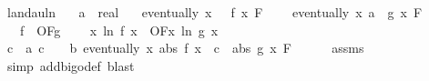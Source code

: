 \begin{isabellebody}
\ landau{\isacharunderscore}{\kern0pt}ln{\isacharunderscore}{\kern0pt}{}{\isacharcolon}{\kern0pt}\isanewline
\ \ \ {\isachardoublequoteopen}a\ {\isachargreater}{\kern0pt}\ {\isacharparenleft}{\kern0pt}{}{\isacharcolon}{\kern0pt}{\isacharcolon}{\kern0pt}real{\isacharparenright}{\kern0pt}{\isachardoublequoteclose}\isanewline
\ \ \ {\isachardoublequoteopen}eventually\ {\isacharparenleft}{\kern0pt}{\isasymlambda}x{\isachardot}{\kern0pt}\ {}\ {\isasymle}\ f\ x{\isacharparenright}{\kern0pt}\ F{\isacharprime}{\kern0pt}{\isachardoublequoteclose}\ \isanewline
\ \ \ {\isachardoublequoteopen}eventually\ {\isacharparenleft}{\kern0pt}{\isasymlambda}x{\isachardot}{\kern0pt}\ a\ {\isasymle}\ g\ x{\isacharparenright}{\kern0pt}\ F{\isacharprime}{\kern0pt}{\isachardoublequoteclose}\ \isanewline
\ \ \ {\isachardoublequoteopen}f\ {\isasymin}\ O{\isacharbrackleft}{\kern0pt}F{\isacharprime}{\kern0pt}{\isacharbrackright}{\kern0pt}{\isacharparenleft}{\kern0pt}g{\isacharparenright}{\kern0pt}{\isachardoublequoteclose}\ \isanewline
\ \ \ {\isachardoublequoteopen}{\isacharparenleft}{\kern0pt}{\isasymlambda}x{\isachardot}{\kern0pt}\ ln\ {\isacharparenleft}{\kern0pt}f\ x{\isacharparenright}{\kern0pt}{\isacharparenright}{\kern0pt}\ {\isasymin}\ O{\isacharbrackleft}{\kern0pt}F{\isacharprime}{\kern0pt}{\isacharbrackright}{\kern0pt}{\isacharparenleft}{\kern0pt}{\isasymlambda}x{\isachardot}{\kern0pt}\ ln\ {\isacharparenleft}{\kern0pt}g\ x{\isacharparenright}{\kern0pt}{\isacharparenright}{\kern0pt}{\isachardoublequoteclose}\ \isanewline
%
\isadelimproof
%
\endisadelimproof
%
\isatagproof
{}\isamarkupfalse%
\ {\isacharminus}{\kern0pt}\isanewline
\ \ \isamarkupfalse%
\ c\ \ a{\isacharcolon}{\kern0pt}\ {\isachardoublequoteopen}c\ {\isachargreater}{\kern0pt}\ {}{\isachardoublequoteclose}\ \ b{\isacharcolon}{\kern0pt}\ {\isachardoublequoteopen}eventually\ {\isacharparenleft}{\kern0pt}{\isasymlambda}x{\isachardot}{\kern0pt}\ abs\ {\isacharparenleft}{\kern0pt}f\ x{\isacharparenright}{\kern0pt}\ {\isasymle}\ c\ {\isacharasterisk}{\kern0pt}\ abs\ {\isacharparenleft}{\kern0pt}g\ x{\isacharparenright}{\kern0pt}{\isacharparenright}{\kern0pt}\ F{\isacharprime}{\kern0pt}{\isachardoublequoteclose}\isanewline
\ \ \ \ \isamarkupfalse%
\ assms{\isacharparenleft}{\kern0pt}{}{\isacharparenright}{\kern0pt}\ \isamarkupfalse%
\ {\isacharparenleft}{\kern0pt}simp\ add{\isacharcolon}{\kern0pt}bigo{\isacharunderscore}{\kern0pt}def{\isacharcomma}{\kern0pt}\ blast{\isacharparenright}{\kern0pt}\isanewline

\end{isabellebody}
